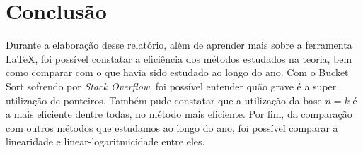 \documentclass[fontsize=11pt]{article}
\begin{document}
\section{Conclusão}
    Durante a elaboração desse relatório, além de aprender mais sobre a ferramenta LaTeX,
    foi possível constatar a eficiência dos métodos estudados na teoria, bem como comparar com o que havia
    sido estudado ao longo do ano. Com o Bucket Sort sofrendo por \textit{Stack Overflow}, foi possível 
    entender quão grave é a super utilização de ponteiros. Também pude constatar que a utilização da base $n=k$ é a 
    mais eficiente dentre todas, no método mais eficiente. Por fim, da comparação com outros métodos que estudamos
    ao longo do ano, foi possível comparar a linearidade e linear-logaritmicidade entre eles.
\printbibliography[heading=bibintoc, title={Referências}]
\end{document}
